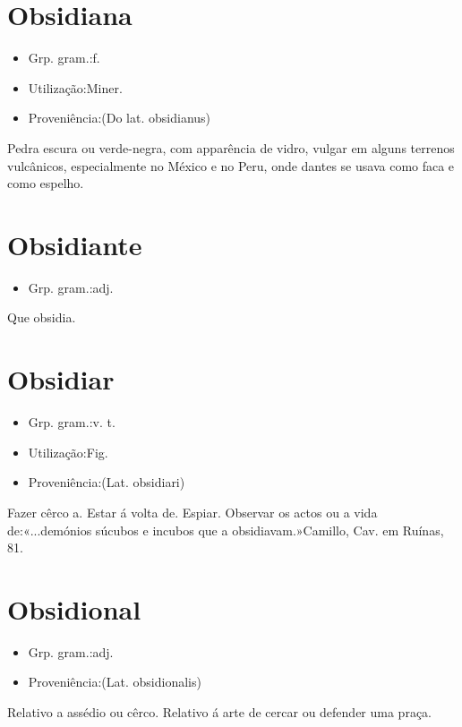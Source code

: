 \section{Obsidiana}
\begin{itemize}
\item {Grp. gram.:f.}
\end{itemize}
\begin{itemize}
\item {Utilização:Miner.}
\end{itemize}
\begin{itemize}
\item {Proveniência:(Do lat. \textunderscore obsidianus\textunderscore )}
\end{itemize}
Pedra escura ou verde-negra, com apparência de vidro, vulgar em alguns terrenos vulcânicos, especialmente no México e no Peru, onde dantes se usava como faca e como espelho.
\section{Obsidiante}
\begin{itemize}
\item {Grp. gram.:adj.}
\end{itemize}
Que obsidia.
\section{Obsidiar}
\begin{itemize}
\item {Grp. gram.:v. t.}
\end{itemize}
\begin{itemize}
\item {Utilização:Fig.}
\end{itemize}
\begin{itemize}
\item {Proveniência:(Lat. \textunderscore obsidiari\textunderscore )}
\end{itemize}
Fazer cêrco a.
Estar á volta de.
Espiar.
Observar os actos ou a vida de:«\textunderscore ...demónios súcubos e incubos que a obsidiavam.\textunderscore »Camillo, \textunderscore Cav. em Ruínas\textunderscore , 81.
\section{Obsidional}
\begin{itemize}
\item {Grp. gram.:adj.}
\end{itemize}
\begin{itemize}
\item {Proveniência:(Lat. \textunderscore obsidionalis\textunderscore )}
\end{itemize}
Relativo a assédio ou cêrco.
Relativo á arte de cercar ou defender uma praça.
